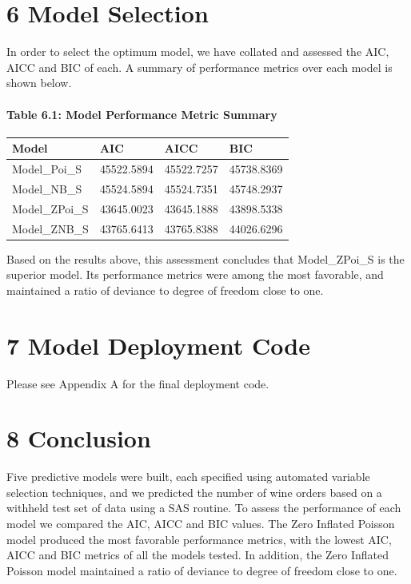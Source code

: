 \documentclass[]{article}
\let\oldparagraph\paragraph
\renewcommand{\paragraph}[1]{\oldparagraph{#1}\mbox{}}
\begin{document}
\section{6 Model Selection}\label{model-selection}

In order to select the optimum model, we have collated and assessed the
AIC, AICC and BIC of each. A summary of performance metrics over each
model is shown below.

\paragraph{Table 6.1: Model Performance Metric
Summary}\label{table-6.1-model-performance-metric-summary}

\begin{longtable}[]{@{}llll@{}}
\toprule
Model & AIC & AICC & BIC\tabularnewline
\midrule
\endhead
Model\_Poi\_S & 45522.5894 & 45522.7257 & 45738.8369\tabularnewline
Model\_NB\_S & 45524.5894 & 45524.7351 & 45748.2937\tabularnewline
Model\_ZPoi\_S & 43645.0023 & 43645.1888 & 43898.5338\tabularnewline
Model\_ZNB\_S & 43765.6413 & 43765.8388 & 44026.6296\tabularnewline
\bottomrule
\end{longtable}

Based on the results above, this assessment concludes that
Model\_ZPoi\_S is the superior model. Its performance metrics were among
the most favorable, and maintained a ratio of deviance to degree of
freedom close to one.

\section{7 Model Deployment Code}\label{model-deployment-code}

Please see Appendix A for the final deployment code.

\section{8 Conclusion}\label{conclusion}

Five predictive models were built, each specified using automated
variable selection techniques, and we predicted the number of wine
orders based on a withheld test set of data using a SAS routine. To
assess the performance of each model we compared the AIC, AICC and BIC
values. The Zero Inflated Poisson model produced the most favorable
performance metrics, with the lowest AIC, AICC and BIC metrics of all
the models tested. In addition, the Zero Inflated Poisson model
maintained a ratio of deviance to degree of freedom close to one.
\end{document}
